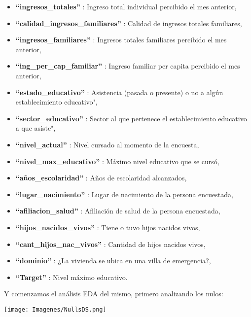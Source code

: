 \documentclass[a4paper]{article}
\begin{document}
\begin{itemize}
        \item \textbf{``ingresos\_totales''}             : Ingreso total individual percibido el mes anterior,
        \item \textbf{``calidad\_ingresos\_familiares''} : Calidad de ingresos totales familiares,
        \item \textbf{``ingresos\_familiares''}          : Ingresos totales familiares percibido el mes anterior,
        \item \textbf{``ing\_per\_cap\_familiar''}       : Ingreso familiar per capita percibido el mes anterior,
        \item \textbf{``estado\_educativo''}             : Asistencia (pasada o presente) o no a algún establecimiento educativo",
        \item \textbf{``sector\_educativo''}             : Sector al que pertenece el establecimiento educativo a que asiste",
        \item \textbf{``nivel\_actual''}                 : Nivel cursado al momento de la encuesta,
        \item \textbf{``nivel\_max\_educativo''}         : Máximo nivel educativo que se cursó,
        \item \textbf{``años\_escolaridad''}             : Años de escolaridad alcanzados,
        \item \textbf{``lugar\_nacimiento''}             : Lugar de nacimiento de la persona encuestada,
        \item \textbf{``afiliacion\_salud''}             : Afiliación de salud de la persona encuestada,
        \item \textbf{``hijos\_nacidos\_vivos''}         : Tiene o tuvo hijos nacidos vivos,
        \item \textbf{``cant\_hijos\_nac\_vivos''}       : Cantidad de hijos nacidos vivos,
        \item \textbf{``dominio''}                       : ¿La vivienda se ubica en una villa de emergencia?,
        \item \textbf{``Target''}                        : Nivel máximo educativo.
    \end{itemize}
 
    \newpage

    Y comenzamos el análisis EDA del mismo, primero analizando los nulos:

    \begin{center}
        \texttt{[image: Imagenes/NullsDS.png]}
    \end{center}
 
\end{document}
